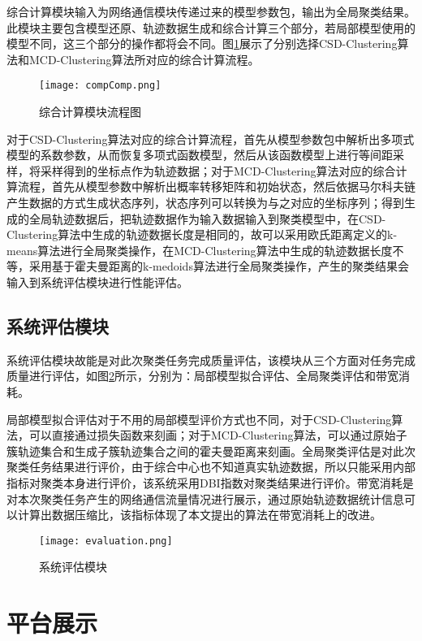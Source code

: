 综合计算模块输入为网络通信模块传递过来的模型参数包，输出为全局聚类结果。此模块主要包含模型还原、轨迹数据生成和综合计算三个部分，若局部模型使用的模型不同，这三个部分的操作都将会不同。图\ref{compComp}展示了分别选择CSD-Clustering算法和MCD-Clustering算法所对应的综合计算流程。
\begin{figure}[H]
	\texttt{[image: compComp.png]}
	\caption{综合计算模块流程图}
	\label{compComp}
\end{figure}

对于CSD-Clustering算法对应的综合计算流程，首先从模型参数包中解析出多项式模型的系数参数，从而恢复多项式函数模型，然后从该函数模型上进行等间距采样，将采样得到的坐标点作为轨迹数据；对于MCD-Clustering算法对应的综合计算流程，首先从模型参数中解析出概率转移矩阵和初始状态，然后依据马尔科夫链产生数据的方式生成状态序列，状态序列可以转换为与之对应的坐标序列；得到生成的全局轨迹数据后，把轨迹数据作为输入数据输入到聚类模型中，在CSD-Clustering算法中生成的轨迹数据长度是相同的，故可以采用欧氏距离定义的k-means算法进行全局聚类操作，在MCD-Clustering算法中生成的轨迹数据长度不等，采用基于霍夫曼距离的k-medoids算法进行全局聚类操作，产生的聚类结果会输入到系统评估模块进行性能评估。

\subsection{系统评估模块}

系统评估模块故能是对此次聚类任务完成质量评估，该模块从三个方面对任务完成质量进行评估，如图\ref{evaluation}所示，分别为：局部模型拟合评估、全局聚类评估和带宽消耗。

局部模型拟合评估对于不用的局部模型评价方式也不同，对于CSD-Clustering算法，可以直接通过损失函数来刻画；对于MCD-Clustering算法，可以通过原始子簇轨迹集合和生成子簇轨迹集合之间的霍夫曼距离来刻画。全局聚类评估是对此次聚类任务结果进行评价，由于综合中心也不知道真实轨迹数据，所以只能采用内部指标对聚类本身进行评价，该系统采用DBI指数对聚类结果进行评价。带宽消耗是对本次聚类任务产生的网络通信流量情况进行展示，通过原始轨迹数据统计信息可以计算出数据压缩比，该指标体现了本文提出的算法在带宽消耗上的改进。
\begin{figure}[H]
	\texttt{[image: evaluation.png]}
	\caption{系统评估模块}
	\label{evaluation}
\end{figure}


\section{平台展示}

